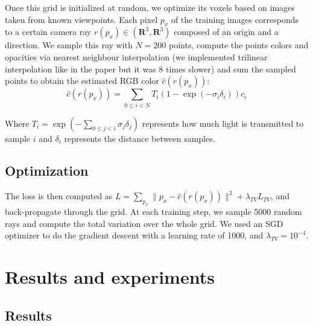 \documentclass{article}
\begin{document}
Once this grid is initialized at random, we optimize its voxels based on images taken from known viewpoints. Each pixel $p_x$ of the training images corresponds to a certain camera ray $r(p_x) \in (\mathbf{R}^3, \mathbf{R}^3)$ composed of an origin and a direction. We sample this ray with $N=200$ points, compute the points colors and opacities via nearest neighbour interpolation (we implemented trilinear interpolation like in the paper but it was 8 times slower) and sum the sampled points to obtain the estimated RGB color $\hat{c}(r(p_x))$:
\[\hat{c}(r(p_x)) = \sum_{0\leq i<N} T_i (1 - \exp(-\sigma_i \delta_i)) c_i\] 

Where $ T_i = \exp(- \sum_{0\leq j<i} \sigma_j \delta_j)$ represents how much light is transmitted to sample $i$ and $\delta_i$ represents the distance between samples.


\subsection{Optimization}
The loss is then computed as $L = \sum_{p_x} \|p_x -\hat{c}(r(p_x)) \|^2 + \lambda_{TV}  L_{TV}$, and back-propagate through the grid. At each training step, we sample 5000 random rays and compute the total variation over the whole grid. We used an SGD optimizer to do the gradient descent with a learning rate of 1000, and $\lambda_{TV} = 10^{-4}$. 

\section{Results and experiments}

\subsection{Results}
\end{document}
